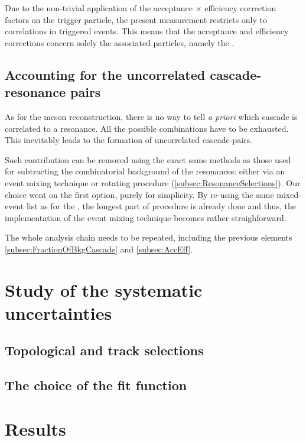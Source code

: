 \begin{figure}[t]
\label{fig:TriggeredContribution}
\end{figure}

Due to the non-trivial application of the acceptance $\times$ efficiency correction factors on the trigger particle, the present measurement restricts only to correlations in triggered events. This means that the acceptance and efficiency corrections concern solely the associated particles, namely the \rmPhiMes.

\subsection{Accounting for the uncorrelated cascade-resonance pairs}
\label{subsec:EvtMixingCascPhi}

As for the \rmPhiMes meson reconstruction, there is no way to tell \textit{a priori} which cascade is correlated to a resonance. All the possible combinations have to be exhausted. This inevitably leads to the formation of uncorrelated cascade-\rmPhiMes pairs. 

Such contribution can be removed using the exact same methods as those used for subtracting the combinatorial background of the resonances: either via an event mixing technique or rotating procedure (\Sec\ref{subsec:ResonanceSelections}). Our choice went on the first option, purely for simplicity. By re-using the same mixed-event list as for the \rmPhiMes, the longest part of procedure is already done and thus, the implementation of the event mixing technique becomes rather straighforward.

The whole analysis chain needs to be repeated, including the previous elements \Sec\ref{subsec:FractionOfBkgCascade} and \ref{subsec:AccEff}.

\section{Study of the systematic uncertainties}

\subsection{Topological and track selections}

\subsection{The choice of the fit function}

\section{Results}


